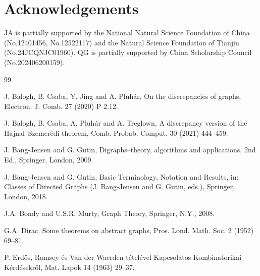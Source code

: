 \documentclass[11pt]{article}
\newcommand{\2}{\vspace{0.2cm}}
\begin{document}
\section*{Acknowledgements} JA is partially supported by the National Natural Science Foundation of China (No.12401456, No.12522117) and the Natural Science Foundation of Tianjin (No.24JCQNJC01960). QG is partially supported by China Scholarship Council (No.202406200159).


\begin{thebibliography}{99}

{\small

 J. Balogh, B. Csaba, Y. Jing and A. Pluh{\'a}r, On the discrepancies of graphs, Electron. J. Comb. 27 (2020) P 2.12.

 J. Balogh, B. Csaba, A. Pluh{\'a}r and A. Treglown, A discrepancy version of the Hajnal–Szemer{\'e}di theorem, Comb. Probab. Comput. 30 (2021) 444--459.



 J. Bang-Jensen and G. Gutin, Digraphs--theory, algorithms and applications, 2nd Ed., Springer, London, 2009.

 J. Bang-Jensen and G. Gutin, Basic Terminology, Notation and Results, in: Classes of Directed Graphs (J. Bang-Jensen and G. Gutin, eds.), Springer, London, 2018.


  J.A. Bondy and U.S.R. Murty, Graph Theory, Springer, N.Y., 2008.


 G.A. Dirac, Some theorems on abstract graphs, Pros. Lond. Math. Soc. 2 (1952) 69--81.

 P. Erd{\H o}s, Ramsey {\'e}s Van der Waerden t{\'e}tel{\'e}vel Kapcsolatos Kombinatorikai K{\'e}rd{\'e}sekr{\H o}l, Mat. Lapok 14 (1963) 29--37.

}
\end{thebibliography}
\end{document}
